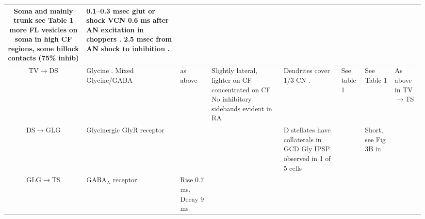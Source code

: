 \begin{longtable}{cYYYYYYY}
Soma and mainly trunk \citep{AltschulerJuizEtAl:1993} 
see Table 1 \citep{SmithRhode:1989} 
more FL vesicles on soma in high CF regions, some hillock contacts (75\% inhib) \citep{JosephsonMorest:1998}
& %
0.1--0.3 msec glut or shock VCN \citep{ZhangOertel:1993}
0.6 ms after AN excitation in choppers \citep{Wickesberg:1996}. 
2.5 msec from AN shock to inhibition \citep{WickesbergOertel:1993}. 
\\ \midrule
TV\ensuremath{\rightarrow}DS                        
&  %
Glycine \citep{OstapoffMorestEtAl:1999,SaintBensonEtAl:1991}. 
Mixed  Glycine/GABA \citep{OsenOttersenEtAl:1990}                 
& %
\citep{OstapoffMorestEtAl:1999}  as above                                  
& %
Slightly lateral, lighter on-CF \citep{OstapoffMorestEtAl:1999}
concentrated on CF \citep{ZhangOertel:1993} 
No inhibitory sidebands evident in RA                                   
& %
Dendrites cover 1/3 CN \citep[guinea pig][]{PalmerJiangEtAl:1996}.
& See table 1 \citep{SmithRhode:1989}     
& See Table 1 \citep{SmithRhode:1989}                          
& 
As above in TV\ensuremath{\rightarrow}TS
\\ \midrule
DS\ensuremath{\rightarrow}GLG                                 
&                  
Glycinergic GlyR receptor                  
&  %
& 
& 
D stellates have collaterals in GCD \citep[mouse][]{OertelWuEtAl:1990}
Gly IPSP observed in 1 of 5 cells \citep{FerragamoGoldingEtAl:1998}    
&                                            
& %
Short, see Fig 3B in \citep{FerragamoGoldingEtAl:1998}
\\ \midrule
GLG\ensuremath{\rightarrow}TS                         
&%
GABA$_{\textrm{A}}$ receptor  \citep[bicuculine-sensitive VCN T stellate cell, mouse slice preparation][]{FerragamoGoldingEtAl:1998} \citep[Chinchilla][]{JosephsonMorest:1998}
& %
Rise 0.7 ms, Decay 9 ms  \citep[probably a combination of two decay time constants, fast 5-10 slow 20-60][]{AwatramaniTurecekEtAl:2005}                     

\end{longtable}
